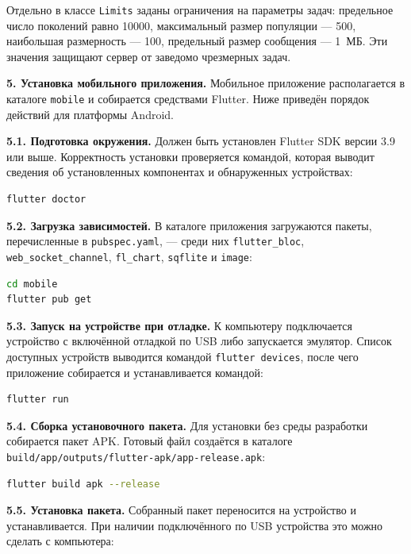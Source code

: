 \documentclass[14pt, a4paper]{extarticle}
\begin{document}
Отдельно в классе \texttt{Limits} заданы ограничения на параметры задач:
предельное число поколений равно 10000, максимальный размер популяции --- 500,
наибольшая размерность --- 100, предельный размер сообщения --- 1~МБ. Эти значения
защищают сервер от заведомо чрезмерных задач.

\medskip
\textbf{5. Установка мобильного приложения.} Мобильное приложение располагается в
каталоге \texttt{mobile} и собирается средствами Flutter. Ниже приведён порядок
действий для платформы Android.

\textbf{5.1. Подготовка окружения.} Должен быть установлен Flutter SDK версии 3.9
или выше. Корректность установки проверяется командой, которая выводит сведения
об установленных компонентах и обнаруженных устройствах:

\begin{lstlisting}[language=bash]
flutter doctor
\end{lstlisting}

\textbf{5.2. Загрузка зависимостей.} В каталоге приложения загружаются пакеты,
перечисленные в \texttt{pubspec.yaml}, --- среди них \texttt{flutter\_bloc},
\texttt{web\_socket\_channel}, \texttt{fl\_chart}, \texttt{sqflite} и
\texttt{image}:

\begin{lstlisting}[language=bash]
cd mobile
flutter pub get
\end{lstlisting}

\textbf{5.3. Запуск на устройстве при отладке.} К компьютеру подключается
устройство с включённой отладкой по USB либо запускается эмулятор. Список
доступных устройств выводится командой \texttt{flutter devices}, после чего
приложение собирается и устанавливается командой:

\begin{lstlisting}[language=bash]
flutter run
\end{lstlisting}

\textbf{5.4. Сборка установочного пакета.} Для установки без среды разработки
собирается пакет APK. Готовый файл создаётся в каталоге
\texttt{build/app/outputs/flutter-apk/app-release.apk}:

\begin{lstlisting}[language=bash]
flutter build apk --release
\end{lstlisting}

\textbf{5.5. Установка пакета.} Собранный пакет переносится на устройство и
устанавливается. При наличии подключённого по USB устройства это можно сделать с
компьютера:
\end{document}
